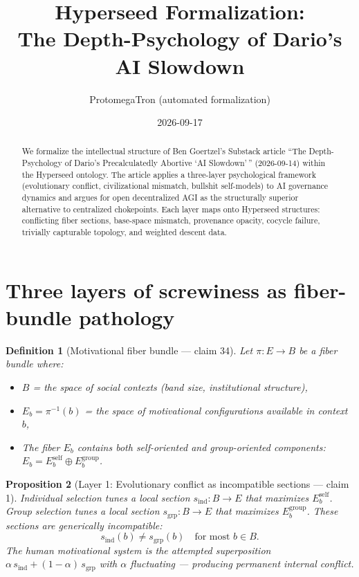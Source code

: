 \documentclass[11pt,a4paper]{article}
\title{Hyperseed Formalization:\\
  The Depth-Psychology of Dario's AI Slowdown}
\author{ProtomegaTron (automated formalization)}
\date{2026-09-17}
\newtheorem{definition}{Definition}[section]
\newtheorem{proposition}[definition]{Proposition}
\begin{document}
\maketitle

\begin{abstract}
We formalize the intellectual structure of Ben Goertzel's Substack article
``The Depth-Psychology of Dario's Precalculatedly Abortive `AI Slowdown'\,''
(2026-09-14) within the Hyperseed ontology. The article applies a three-layer
psychological framework (evolutionary conflict, civilizational mismatch,
bullshit self-models) to AI governance dynamics and argues for open
decentralized AGI as the structurally superior alternative to centralized
chokepoints. Each layer maps onto Hyperseed structures: conflicting fiber
sections, base-space mismatch, provenance opacity, cocycle failure, trivially
capturable topology, and weighted descent data.
\end{abstract}

\tableofcontents

\section{Three layers of screwiness as fiber-bundle pathology}
\label{sec:three-layers}

\begin{definition}[Motivational fiber bundle --- claim 34]
\label{def:motivational-bundle}
Let $\pi : E \to B$ be a fiber bundle where:
\begin{itemize}
\item $B$ = the space of social contexts (band size, institutional structure),
\item $E_b = \pi^{-1}(b)$ = the space of motivational configurations available
  in context $b$,
\item The fiber $E_b$ contains both self-oriented and group-oriented components:
  $E_b = E_b^{\text{self}} \oplus E_b^{\text{group}}$.
\end{itemize}
\end{definition}

\begin{proposition}[Layer 1: Evolutionary conflict as incompatible sections --- claim 1]
\label{prop:layer1}
Individual selection tunes a local section $s_{\text{ind}} : B \to E$ that
maximizes $E_b^{\text{self}}$. Group selection tunes a local section
$s_{\text{grp}} : B \to E$ that maximizes $E_b^{\text{group}}$. These
sections are generically incompatible:
\[
  s_{\text{ind}}(b) \neq s_{\text{grp}}(b) \quad \text{for most } b \in B.
\]
The human motivational system is the attempted superposition
$\alpha\, s_{\text{ind}} + (1-\alpha)\, s_{\text{grp}}$ with $\alpha$
fluctuating --- producing permanent internal conflict.
\end{proposition}
\end{document}
